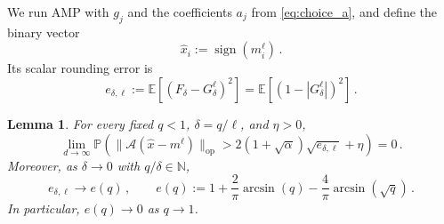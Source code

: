 \documentclass[11pt]{article}
\newtheorem{lemma}[theorem]{Lemma}
\theoremstyle{definition}
\theoremstyle{remark}
\numberwithin{equation}{section}
\numberwithin{theorem}{section}
\newcommand{\N}{\mathbb N}
\newcommand{\E}{\mathbb E}
\newcommand{\Prob}{\mathbb P}
\newcommand{\op}{\mathrm{op}}
\newcommand{\cA}{\mathcal A}
\begin{document}
We run AMP with $g_j$ and the coefficients $a_j$ from \eqref{eq:choice_a}, and define the binary vector
\begin{equation}\label{eq:terminal-sign-vector}
 \widehat x_i:=\operatorname{sign}(m_i^\ell)\,.
\end{equation}
Its scalar rounding error is
\begin{equation}\label{eq:ideal-rounding-error}
 e_{\delta,\ell}
 :=\E[(F_\delta-G_\delta^\ell)^2]
 =\E[(1-|G_\delta^\ell|)^2]\,.
\end{equation}

\begin{lemma}
\label{lem:rounding-correction}
For every fixed $q<1$, $\delta=q/\ell$, and $\eta>0$,
\begin{equation}\label{eq:finite-mesh-rounding-bound}
 \lim_{d\to\infty}
 \Prob\left(
 \bigl\|\cA(\widehat x-m^\ell)\bigr\|_{\op}
 >
 2(1+\sqrt\alpha)\sqrt{e_{\delta,\ell}}+\eta
 \right)=0 \, .
\end{equation}
Moreover, as $\delta\to 0$ with $q/\delta\in\N$,
\begin{equation}\label{eq:continuum-rounding-error}
 e_{\delta,\ell}\longrightarrow e(q)\,,
 \qquad
 e(q)
 :=
 1+\frac{2}{\pi}\arcsin(q)
   -\frac{4}{\pi}\arcsin(\sqrt q)\,.
\end{equation}
In particular, $e(q)\to 0$ as $q\to 1$. 
\end{lemma}
\end{document}
